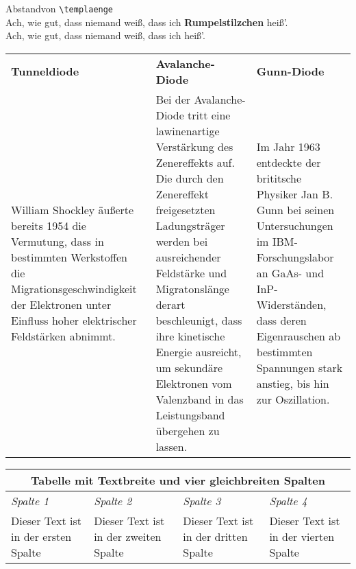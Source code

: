 \documentclass[a4paper, 12pt]{article} %
\newlength{\templaenge}%
\newlength{\tunneldiode}
\newlength{\avalancheDiode}
\newlength{\gunnDiode}
\begin{document}
\setlength{\templaenge}{8cm}
Abstand\hspace{\templaenge}von \verb+\templaenge+\\
Ach, wie gut, dass niemand weiß, dass ich \textbf{Rumpelstilzchen} heiß’.\\
Ach, wie gut, dass niemand weiß, dass ich \hspace{\templaenge} heiß’.



\begin{tabular}{|p{\tunneldiode}|p{\avalancheDiode}|p{\gunnDiode}|}

    \textbf{\Large Tunneldiode} & \textbf{\Large Avalanche-Diode} & 
    \textbf{\Large Gunn-Diode}\\
    {\small\sffamily William Shockley äußerte bereits 1954 die Vermutung, dass in 
    bestimmten Werkstoffen die Migrationsgeschwindigkeit der Elektronen unter
    Einfluss hoher elektrischer Feldstärken abnimmt.} & 
    {\small\sffamily Bei der Avalanche-Diode tritt eine lawinenartige Verstärkung des 
    Zenereffekts auf. Die durch den Zenereffekt freigesetzten 
    Ladungsträger werden bei ausreichender Feldstärke und 
    Migratonslänge derart beschleunigt, dass ihre kinetische Energie 
    ausreicht, um sekundäre Elektronen vom Valenzband in das 
    Leistungsband übergehen zu lassen.} & 
    {\small\sffamily Im Jahr 1963 entdeckte der brititsche Physiker 
    Jan B. Gunn bei seinen Untersuchungen im IBM-
    Forschungslabor an GaAs- und InP-Widerständen,
    dass deren Eigenrauschen ab bestimmten Spannungen stark
    anstieg, bis hin zur Oszillation.}

\end{tabular}\vspace{3cm}

\setlength{\arrayrulewidth}{1pt}

\begin{tabular}%
    {|*{4}{p{}|}}  %
    \hline\multicolumn{4}{|c|}{\bfseries
    Tabelle mit Textbreite und vier gleichbreiten Spalten}\\
    \hline\itshape
    Spalte 1 & \itshape
    Spalte 2 &\itshape
    Spalte 3 & \itshape
    Spalte 4\\
    \hline\hline
    Dieser Text ist in der ersten Spalte &
    Dieser Text ist in der zweiten Spalte &
    Dieser Text ist in der dritten Spalte &
    Dieser Text ist in der vierten Spalte\\
    \hline
\end{tabular}
\end{document}
